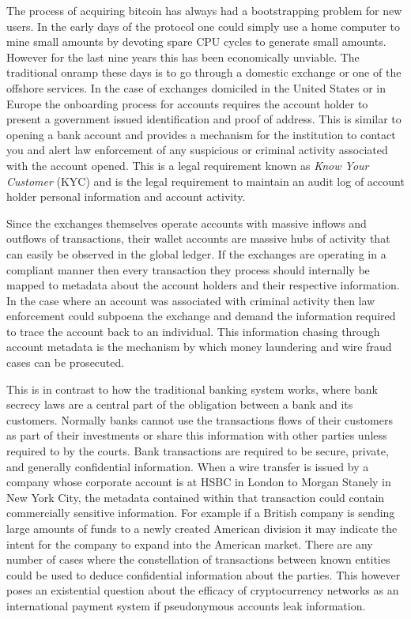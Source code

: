
The process of acquiring bitcoin has always had a bootstrapping problem for new
users. In the early days of the protocol one could simply use a home computer to
mine small amounts by devoting spare CPU cycles to generate small amounts.
However for the last nine years this has been economically unviable. The
traditional onramp these days is to go through a domestic exchange or one of the
offshore services. In the case of exchanges domiciled in the United States or in
Europe the onboarding process for accounts requires the account holder to
present a government issued identification and proof of address. This is similar
to opening a bank account and provides a mechanism for the institution to
contact you and alert law enforcement of any suspicious or criminal activity
associated with the account opened. This is a legal requirement known as
\textit{Know Your Customer} (KYC) and is the legal requirement to maintain an
audit log of account holder personal information and account activity.


Since the exchanges themselves operate accounts with massive inflows and
outflows of transactions, their wallet accounts are massive hubs of activity
that can easily be observed in the global ledger. If the exchanges are operating
in a compliant manner then every transaction they process should internally be
mapped to metadata about the account holders and their respective information.
In the case where an account was associated with criminal activity then law
enforcement could subpoena the exchange and demand the information required to
trace the account back to an individual. This information chasing through
account metadata is the mechanism by which money laundering and wire fraud cases
can be prosecuted.


This is in contrast to how the traditional banking system works, where
bank secrecy laws are a central part of the obligation between a bank
and its customers. Normally banks cannot use the transactions flows of
their customers as part of their investments or share this information
with other parties unless required to by the courts. Bank transactions
are required to be secure, private, and generally confidential
information. When a wire transfer is issued by a company whose corporate
account is at HSBC in London to Morgan Stanely in New York City, the
metadata contained within that transaction could contain commercially
sensitive information. For example if a British company is sending large
amounts of funds to a newly created American division it may indicate
the intent for the company to expand into the American market. There are
any number of cases where the constellation of transactions between
known entities could be used to deduce confidential information about
the parties. This however poses an existential question about the
efficacy of cryptocurrency networks as an international payment system
if pseudonymous accounts leak information.


